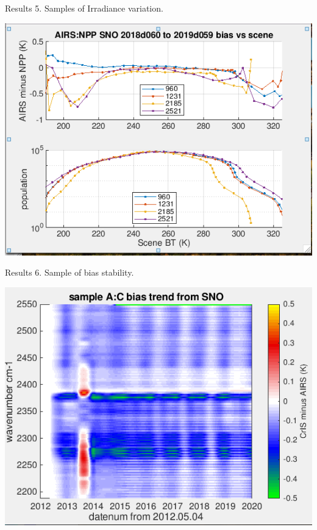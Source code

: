 \documentclass[10pt,t]{beamer}
\begin{document}
\begin{frame}{Results 5. Samples of Irradiance variation.}

  \begin{center}
    \includegraphics[width=0.6\linewidth]{./Figs/plot1.png}
  \end{center}

  
\end{frame}

\begin{frame}{Results 6. Sample of bias stability.}

  \begin{center}
    \includegraphics[width=0.6\linewidth]{./Figs/plot6.png}
  \end{center}
  
  
\end{frame}
\end{document}
